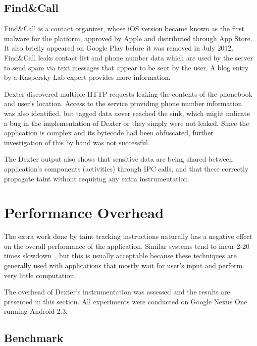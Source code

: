 \documentclass[12pt,twoside,notitlepage]{report}
\begin{document}
\subsection{Find\&Call}

Find\&Call is a contact organizer, whose iOS version became known as the first malware for the platform, approved by Apple and distributed through App Store. It also briefly appeared on Google Play before it was removed in July 2012. Find\&Call leaks contact list and phone number data which are used by the server to send spam via text messages that appear to be sent by the user. A blog entry~\cite{report:FindAndCall} by a Kaspersky Lab expert provides more information.

Dexter discovered multiple HTTP requests leaking the contents of the phonebook and user's location. Access to the service providing phone number information was also identified, but tagged data never reached the sink, which might indicate a bug in the implementation of Dexter or they simply were not leaked. Since the application is complex and its bytecode had been obfuscated, further investigation of this by hand was not successful. 

The Dexter output also shows that sensitive data are being shared between application's components (activities) through IPC calls, and that these correctly propagate taint without requiring any extra instrumentation.

\section{Performance Overhead}

The extra work done by taint tracking instructions naturally has a negative effect on the overall performance of the application. Similar systems tend to incur 2-20 times slowdown~\cite{Yin:2007:PCS:1315245.1315261, Chow:2004:UDL:1251375.1251397}, but this is usually acceptable because these techniques are generally used with applications that mostly wait for user's input and perform very little computation. 

The overhead of Dexter's instrumentation was assessed and the results are presented in this section. All experiments were conducted on Google Nexus One running Android 2.3. 

\subsection{Benchmark}
\end{document}
